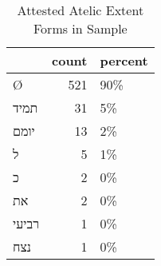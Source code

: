\begin{table}[htbp!]
\centering
\caption{Attested Atelic Extent Forms in Sample}
\label{table:atel_front}
\begin{tabular}{lrl}
\toprule
{} &  count & percent \\
\midrule
\texthebrew{Ø}     &    521 &     90\% \\
\texthebrew{תמיד}  &     31 &      5\% \\
\texthebrew{יומם}  &     13 &      2\% \\
\texthebrew{ל}     &      5 &      1\% \\
\texthebrew{כ}     &      2 &      0\% \\
\texthebrew{את}    &      2 &      0\% \\
\texthebrew{רביעי} &      1 &      0\% \\
\texthebrew{נצח}   &      1 &      0\% \\
\bottomrule
\end{tabular}
\end{table}
